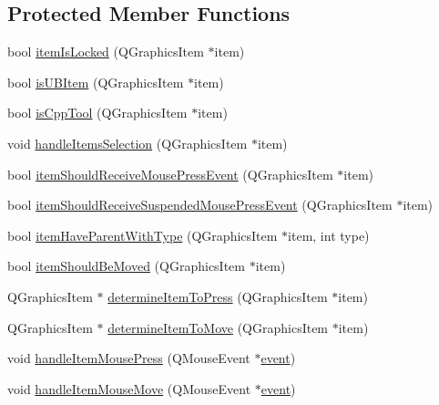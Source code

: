 \subsection*{Protected Member Functions}
\begin{DoxyCompactItemize}
\item 
bool \hyperlink{class_u_b_board_view_a6d2e66eedc57c62d4351fbc4f3cc6569}{item\-Is\-Locked} (Q\-Graphics\-Item $\ast$item)
\item 
bool \hyperlink{class_u_b_board_view_aea986caa709a9c6f2877b41e5d7bbdea}{is\-U\-B\-Item} (Q\-Graphics\-Item $\ast$item)
\item 
bool \hyperlink{class_u_b_board_view_a17cf1c3f67b4f9281f21abf8ec5b32b5}{is\-Cpp\-Tool} (Q\-Graphics\-Item $\ast$item)
\item 
void \hyperlink{class_u_b_board_view_a3e6f545e0dac2d4108b835dc0d0bfc9e}{handle\-Items\-Selection} (Q\-Graphics\-Item $\ast$item)
\item 
bool \hyperlink{class_u_b_board_view_a1cab6df2225f2748e66144b4eaa89844}{item\-Should\-Receive\-Mouse\-Press\-Event} (Q\-Graphics\-Item $\ast$item)
\item 
bool \hyperlink{class_u_b_board_view_a0d5ff37e2ae889c4cb6a7a7bc608c267}{item\-Should\-Receive\-Suspended\-Mouse\-Press\-Event} (Q\-Graphics\-Item $\ast$item)
\item 
bool \hyperlink{class_u_b_board_view_a7943c576795e6fbb1138203abbea65c8}{item\-Have\-Parent\-With\-Type} (Q\-Graphics\-Item $\ast$item, int type)
\item 
bool \hyperlink{class_u_b_board_view_abbe27791d3c99c505f38e8b87013e9f2}{item\-Should\-Be\-Moved} (Q\-Graphics\-Item $\ast$item)
\item 
Q\-Graphics\-Item $\ast$ \hyperlink{class_u_b_board_view_a6984a1cb5fb66a66b18e37966d6e127e}{determine\-Item\-To\-Press} (Q\-Graphics\-Item $\ast$item)
\item 
Q\-Graphics\-Item $\ast$ \hyperlink{class_u_b_board_view_ab7d920be31a90777998b2bd7af2fb96b}{determine\-Item\-To\-Move} (Q\-Graphics\-Item $\ast$item)
\item 
void \hyperlink{class_u_b_board_view_a1818c4d69a09adc9bb98079d2210564d}{handle\-Item\-Mouse\-Press} (Q\-Mouse\-Event $\ast$\hyperlink{class_u_b_board_view_a9052cd8486cf023aaff430a859f2f4af}{event})
\item 
void \hyperlink{class_u_b_board_view_aa0ffd2f772d688eb459b316c36404188}{handle\-Item\-Mouse\-Move} (Q\-Mouse\-Event $\ast$\hyperlink{class_u_b_board_view_a9052cd8486cf023aaff430a859f2f4af}{event})
\item 

\end{DoxyCompactItemize}
